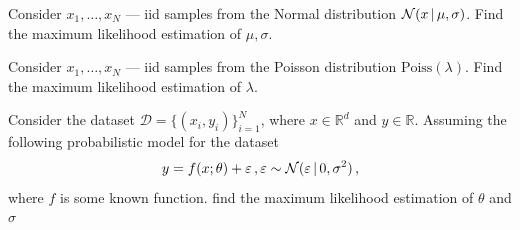 \begin{exercise}
    Consider $x_1,\ldots,x_N$ --- iid samples from the Normal distribution $\mathcal{N}(x\,|\, \mu, \sigma)$. Find the maximum likelihood estimation of $\mu,\sigma$.
\end{exercise}

\begin{exercise}
    Consider $x_1,\ldots,x_N$ --- iid samples from the Poisson distribution $\text{Poiss}(\lambda)$. Find the maximum likelihood estimation of $\lambda$.
\end{exercise}

\begin{proposition}
    Consider the dataset $\mathcal{D} = \{(x_i, y_i)\}_{i=1}^N$, where $x \in \mathbb{R}^d$ and $y \in \mathbb{R}$.
    Assuming the following probabilistic model for the dataset
    \begin{align}
        y = f(x;\theta) + \varepsilon\,, \varepsilon \sim \mathcal{N}(\varepsilon\,|\, 0,\sigma^2)\,,
    \end{align}
    where $f$ is some known function.
    find the maximum likelihood estimation of $\theta$ and $\sigma$
\end{proposition}
